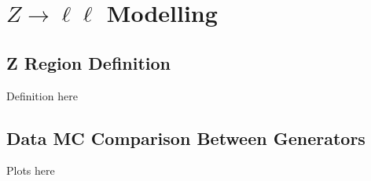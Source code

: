 \section{$Z\rightarrow\ell\ell$ Modelling}
\label{sec:zcr}

\subsection{Z Region Definition}

Definition here

\subsection{Data MC Comparison Between Generators}

Plots here


